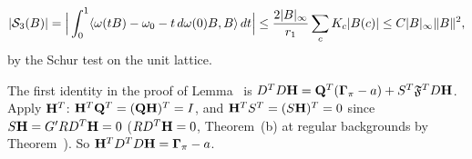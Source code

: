 \begin{detail}
\begin{step}
\[
|\mathcal S_3(B)|=\Big|\int_0^1\langle \omega(tB)-\omega_0-t\,d\omega(0)B,B\rangle\,dt\Big|\le\frac{2|B|_\infty}{r_1}\sum_cK_c|B(c)|\le C|B|_\infty\|B\|^2,
\]
by the Schur test on the unit lattice.
\end{step}
\end{detail}

\begin{detail}\label{d7:Heff}
The first identity in the proof of Lemma~ is $D^TD\mathbf H=\mathbf Q^T(\boldsymbol\Gamma_\pi-a)+S^T\mathfrak F^TD\mathbf H$. Apply $\mathbf H^T$: $\mathbf H^T\mathbf Q^T=(\mathbf Q\mathbf H)^T=I$, and $\mathbf H^TS^T=(S\mathbf H)^T=0$ since $S\mathbf H=G'RD^T\mathbf H=0$ ($RD^T\mathbf H=0$, Theorem~(b) at regular backgrounds by Theorem~). So $\mathbf H^TD^TD\mathbf H=\boldsymbol\Gamma_\pi-a$.
\end{detail}

